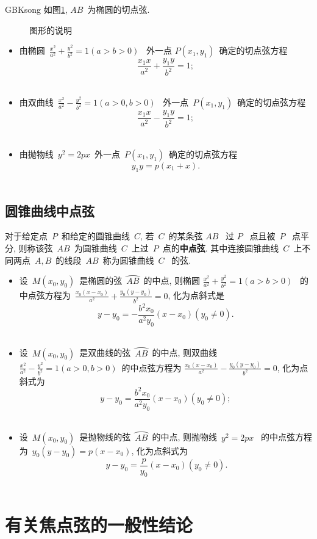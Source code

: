 \documentclass[a4paper, 12pt, twoside]{ctexart}
\begin{document}
\begin{CJK*}{GBK}{song}
    如图\ref{fig2}, $AB$~为椭圆的切点弦.
    \begin{figure}[H]\centering
    \caption{\label{fig2} 图形的说明}
    \end{figure}
    \begin{itemize}
        \item 由椭圆~$\frac{x^2}{a^2}+\frac{y^2}{b^2}=1(a>b>0)$~ 外一点 $P(x_1, y_1)$~确定的切点弦方程
                $$~\frac{x_1x}{a^2}+\frac{y_1y}{b^2}=1;~$$~
        \item 由双曲线~$\frac{x^2}{a^2}-\frac{y^2}{b^2}=1(a>0,  b>0)$~ 外一点~$P(x_1,y_1)$~确定的切点弦方程
                $$~\frac{x_1x}{a^2}-\frac{y_1y}{b^2}=1;~$$~
        \item 由抛物线~$y^2=2px$~外一点~$P(x_1,y_1)$~确定的切点弦方程
            $$~y_1y=p(x_1+x).~$$~
    \end{itemize}
\subsection{圆锥曲线中点弦}
    \begin{defi}
        对于给定点~$P$~和给定的圆锥曲线~$C$,  若~$C$~的某条弦 $AB$~ 过 $P$~ 点且被~$P$~ 点平分, 则称该弦~$AB$~为圆锥曲线~$C$~上过~$P$~点的\textbf{中点弦}. 其中连接圆锥曲线~$C$~上不同两点~$A,B$~的线段~$AB$~称为圆锥曲线~$C$~ 的弦.
    \end{defi}

    \begin{itemize}
    \item 设~$M(x_0, y_0)$~是椭圆的弦~$\wideparen{AB}$~的中点, 则椭圆 $\frac{x^2}{a^2}+\frac{y^2}{b^2}=1(a>b>0)$~ 的中点弦方程为~$\frac{x_0(x-x_0)}{a^2}+\frac{y_0(y-y_0)}{b^2}=0$, 化为点斜式是
        $$~y-y_0=-\frac{b^2 x_0}{a^2 y_0}(x-x_0)(y_0\ne0).~$$~
    \item 设~$M(x_0, y_0)$~是双曲线的弦~$\wideparen{AB}$~的中点, 则双曲线 $\frac{x^2}{a^2}-\frac{y^2}{b^2}=1(a>0,  b>0)$~的中点弦方程为 $\frac{x_0(x-x_0)}{a^2}-\frac{y_0(y-y_0)}{b^2}=0$, 化为点斜式为
            $$~y-y_0=\frac{b^2 x_0}{a^2 y_0}(x-x_0)(y_0\ne0);~$$~
    \item 设~$M(x_0,y_0)$~是抛物线的弦~$\wideparen{AB}$~的中点, 则抛物线~$y^2=2px$~ 的中点弦方程为~$y_0(y-y_0)=p(x-x_0)$, 化为点斜式为
    $$~y-y_0=\frac{p}{y_0}(x-x_0)(y_0\ne0). $$~
    \end{itemize}
\section{有关焦点弦的一般性结论}

\end{CJK*}
\end{document}
